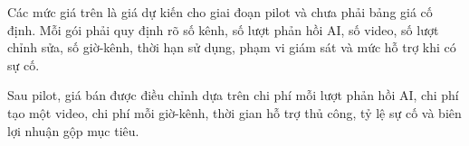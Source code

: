 Các mức giá trên là giá dự kiến cho giai đoạn pilot và chưa phải bảng giá cố
định. Mỗi gói phải quy định rõ số kênh, số lượt phản hồi AI, số video, số lượt
chỉnh sửa, số giờ-kênh, thời hạn sử dụng, phạm vi giám sát và mức hỗ trợ khi có
sự cố.

Sau pilot, giá bán được điều chỉnh dựa trên chi phí mỗi lượt phản hồi AI, chi
phí tạo một video, chi phí mỗi giờ-kênh, thời gian hỗ trợ thủ công, tỷ lệ sự cố
và biên lợi nhuận gộp mục tiêu.